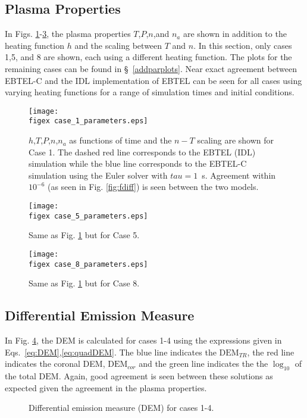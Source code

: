 \documentclass[preprint,10pt]{aastex}
\newcommand{\figex}{/Users/willbarnes/Documents/Rice/Research/EBTEL_figures/}
\begin{document}
\subsection{Plasma Properties}\label{looppars}
In Figs. \ref{fig:case1}-\ref{fig:case8}, the plasma properties $T$,$P$,$n$,and $n_a$ are shown in addition to the heating function $h$ and the scaling between $T$ and $n$. In this section, only cases 1,5, and 8 are shown, each using a different heating function. The plots for the remaining cases can be found in \S~\ref{addparplots}. Near exact agreement between EBTEL-C and the IDL implementation of EBTEL can be seen for all cases using varying heating functions for a range of simulation times and initial conditions. 
%
\begin{figure}[]
\centering
\texttt{[image: \\figex case\_1\_parameters.eps]}
\caption{$h$,$T$,$P$,$n$,$n_a$ as functions of time and the $n-T$ scaling are shown for Case 1. The dashed red line corresponds to the EBTEL (IDL) simulation while the blue line corresponds to the EBTEL-C simulation using the Euler solver with $tau=1$~s. Agreement within $10^{-6}$ (as seen in Fig. \ref{fig:fdiff}) is seen between the two models.}
\label{fig:case1}
\end{figure}
%
\begin{figure}[]
\centering
\texttt{[image: \\figex case\_5\_parameters.eps]}
\caption{Same as Fig. \ref{fig:case1} but for Case 5.}
\label{fig:case5}
\end{figure}
%
\begin{figure}[]
\centering
\texttt{[image: \\figex case\_8\_parameters.eps]}
\caption{Same as Fig. \ref{fig:case1} but for Case 8.}
\label{fig:case8}
\end{figure}
%
\subsection{Differential Emission Measure}
In Fig. \ref{fig:case1-4dem}, the DEM is calculated for cases 1-4 using the expressions given in Eqs.~\ref{eq:DEM},\ref{eq:quadDEM}. The blue line indicates the $\text{DEM}_{TR}$, the red line indicates the coronal DEM, $\text{DEM}_{cor}$ and the green line indicates the the $\log_{10}$ of the total $\text{DEM}$. Again, good agreement is seen between these solutions as expected given the agreement in the plasma properties. 
%
\begin{figure}[]
\centering
{}
\caption{Differential emission measure (DEM) for cases 1-4.}
\label{fig:case1-4dem}
\end{figure}
%
\end{document}
